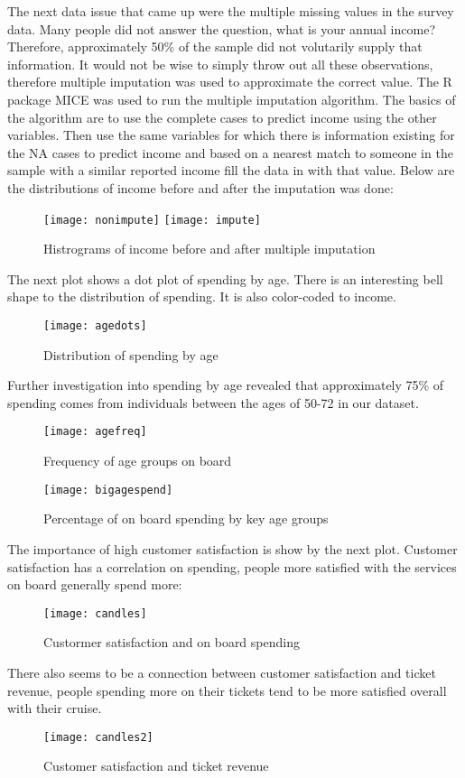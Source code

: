 \documentclass[twoside,twocolumn]{article}
\begin{document}
The next data issue that came up were the multiple missing values in the survey data. Many people did not answer the question, what is your annual income? Therefore, approximately 50\% of the sample did not volutarily supply that information. It would not be wise to simply throw out all these observations, therefore multiple imputation was used to approximate the correct value. The R package MICE was used to run the multiple imputation algorithm. The basics of the algorithm are to use the complete cases to predict income using the other variables. Then use the same variables for which there is information existing for the NA cases to predict income and based on a nearest match to someone in the sample with a similar reported income fill the data in with that value. Below are the distributions of income before and after the imputation was done:

\begin{figure}[H]
	\texttt{[image: nonimpute]}
	\texttt{[image: impute]}
\caption{Histrograms of income before and after multiple imputation}
\end{figure}

The next plot shows a dot plot of spending by age. There is an interesting bell shape to the distribution of spending. It is also color-coded to income.

\begin{figure}[H]
	\centering
	\texttt{[image: agedots]}
	\caption{Distribution of spending by age}
\end{figure}

Further investigation into spending by age revealed that approximately 75\% of spending comes from individuals between the ages of 50-72 in our dataset. 

\begin{figure}[H]
	\centering
	\texttt{[image: agefreq]}
	\caption{Frequency of age groups on board}
\end{figure}

\begin{figure}[H]
	\centering
	\texttt{[image: bigagespend]}
	\caption{Percentage of on board spending by key age groups}
\end{figure}

The importance of high customer satisfaction is show by the next plot. Customer satisfaction has a correlation on spending, people more satisfied with the services on board generally spend more:

\begin{figure}[H]
	\centering 
	\texttt{[image: candles]}
	\caption{Custormer satisfaction and on board spending}
\end{figure}
There also seems to be a connection between customer satisfaction and ticket revenue, people spending more on their tickets tend to be more satisfied overall with their cruise. 
\begin{figure}[H]
	\centering 
	\texttt{[image: candles2]}
	\caption{Customer satisfaction and ticket revenue}
\end{figure}
\end{document}
